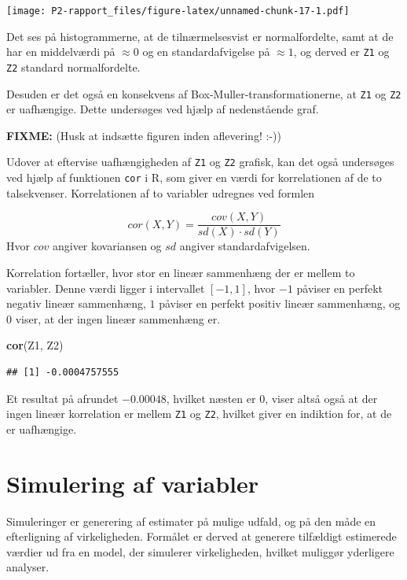 \documentclass[
]{book}
\newenvironment{Shaded}{\begin{snugshade}}{\end{snugshade}}
\newcommand{\KeywordTok}[1]{\textcolor[rgb]{0.13,0.29,0.53}{\textbf{#1}}}
\newcommand{\NormalTok}[1]{#1}
\theoremstyle{definition}
\theoremstyle{definition}
\theoremstyle{definition}
\theoremstyle{remark}
\begin{document}
\texttt{[image: P2-rapport\_files/figure-latex/unnamed-chunk-17-1.pdf]}

Det ses på histogrammerne, at de tilnærmelsesvist er normalfordelte, samt at de har en middelværdi på \(\approx 0\) og en standardafvigelse på \(\approx 1\), og derved er \texttt{Z1} og \texttt{Z2} standard normalfordelte.

Desuden er det også en konsekvens af Box-Muller-transformationerne, at \texttt{Z1} og \texttt{Z2} er uafhængige. Dette undersøges ved hjælp af nedenstående graf.

\textbf{FIXME:} (Husk at indsætte figuren inden aflevering! :-))

Udover at eftervise uafhængigheden af \texttt{Z1} og \texttt{Z2} grafisk, kan det også undersøges ved hjælp af funktionen \texttt{cor} i R, som giver en værdi for korrelationen af de to talsekvenser.
Korrelationen af to variabler udregnes ved formlen

\[
cor(X, Y) = \frac{cov(X, Y)}{sd(X) \cdot sd(Y)}  
\]
Hvor \(cov\) angiver kovariansen og \(sd\) angiver standardafvigelsen.

Korrelation fortæller, hvor stor en lineær sammenhæng der er mellem to variabler. Denne værdi ligger i intervallet \([-1, 1]\), hvor \(-1\) påviser en perfekt negativ lineær sammenhæng, \(1\) påviser en perfekt positiv lineær sammenhæng, og \(0\) viser, at der ingen lineær sammenhæng er.

\begin{Shaded}
\begin{Highlighting}[]
\KeywordTok{cor}\NormalTok{(Z1, Z2)}
\end{Highlighting}
\end{Shaded}

\begin{verbatim}
## [1] -0.0004757555
\end{verbatim}

Et resultat på afrundet \(-0.00048\), hvilket næsten er 0, viser altså også at der ingen lineær korrelation er mellem \texttt{Z1} og \texttt{Z2}, hvilket giver en indiktion for, at de er uafhængige.

\hypertarget{simulering-af-variabler}{%
\section{Simulering af variabler}\label{simulering-af-variabler}}

Simuleringer er generering af estimater på mulige udfald, og på den måde en efterligning af virkeligheden. Formålet er derved at generere tilfældigt estimerede værdier ud fra en model, der simulerer virkeligheden, hvilket muliggør yderligere analyser.
\end{document}
